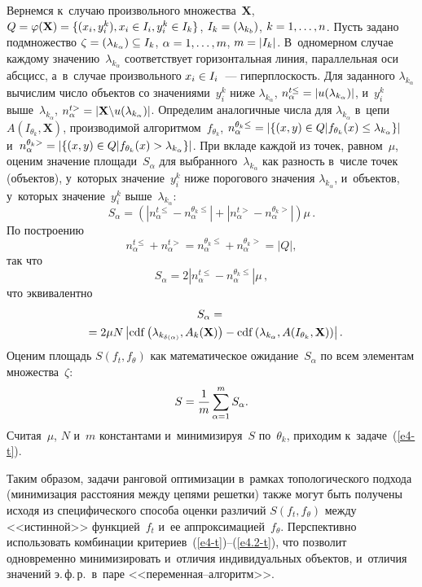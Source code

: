 \begin{multicols}{2}
    Вернемся к~случаю произвольного множества~$\mathbf{X}$, $Q\hm= 
\varphi(\mathbf{X}) \hm=\{(x_i, y_i^k), x_i\hm\in I_i, y_i^k\hm\in I_k\}$, $I_k\hm= 
(\lambda_{k_b})$, $k\hm=1,\ldots,n$. Пусть задано подмножество 
$\zeta\hm=(\lambda_{k_\alpha})\hm\subseteq I_k$, $\alpha\hm=1,\ldots ,m$, 
$m\hm=\vert I_k \vert$. В~одномерном случае каждому 
значению~$\lambda_{k_\alpha}$ соответствует горизонтальная линия, 
параллельная оси абсцисс, а~в~случае произвольного $x_i\hm\in I_i$~--- 
гиперплоскость. Для заданного $\lambda_{k_\alpha}$ вычислим число объектов 
со значениями~$y_i^k$ ниже $\lambda_{k_\alpha}$, $n_\alpha^{t\leq} \hm= \vert 
u(\lambda_{k_\alpha})\vert$, и~$y_i^k$ выше~$\lambda_{k_\alpha}$, 
$n_\alpha^{t>} \hm= \vert \mathbf{X}\backslash u(\lambda_{k_\alpha})\vert$. 
Определим аналогичные числа для $\lambda_{k_\alpha}$ 
в~цепи~${A}(I_{\theta_k}, \mathbf{X})$, производимой 
алгоритмом~$f_{\theta_k}$, $n_\alpha^{\theta_k \leq} \hm= \vert \{ (x,y)\hm\in 
Q\vert f_{\theta_k}(x)\leq \lambda_{k_\alpha}\}\vert$ и~$n_\alpha^{\theta_k >} 
\hm= \vert \{ (x,y)\hm\in Q\vert f_{\theta_k}(x)\hm> \lambda_{k_\alpha}\}\vert$. 
При вкладе каждой из точек, равном~$\mu$, оценим значение 
площади~$S_\alpha$ для выбранного~$\lambda_{k_\alpha}$ как разность 
в~чис\-ле точек (объектов), у~которых значение~$y_i^k$ ниже порогового 
значения $\lambda_{k_\alpha}$, и~объектов, у~которых значение~$y_i^k$ 
выше~$\lambda_{k_\alpha}$:
$$
S_\alpha= \left(\left\vert n_\alpha^{t\leq} - 
n_\alpha^{\theta_k \leq} \right\vert + \left\vert n_\alpha^{t>} - n_\alpha^{\theta_k 
>}\right\vert \right) \mu\,.
$$
 По построению 
 $$
 n_\alpha^{t\leq} + n_\alpha^{t>} = 
n_\alpha^{\theta_k \leq} + n_\alpha^{\theta_k >} = \vert Q\vert,
$$
 так что 
$$
S_\alpha= 2\left\vert n_\alpha^{t\leq} - n_\alpha^{\theta_k \leq}\right\vert \mu\,,
$$
 что 
эквивалентно 
\begin{multline*}
S_\alpha ={}\\
{}= 2\mu N\left\vert \mathrm{cdf} \left( 
\lambda_{k_{\delta(\alpha)}},{A}_k(\mathbf{X})\right)- \mathrm{cdf} 
\left( \lambda_{k_\alpha}, {A}(I_{\theta_k},\mathbf{X})\right)\right\vert.\hspace*{-4.67494pt}
\end{multline*}
Оценим площадь $S(f_t,f_\theta)$ как математическое ожидание~$S_\alpha$ по 
всем элементам множества~$\zeta$:
$$
S= \displaystyle\frac{\displaystyle 1\mathstrut}{\displaystyle m\mathstrut}\sum\limits^m_{\alpha=1} S_\alpha.
$$
 Считая~$\mu$, $N$ и~$m$ константами и~минимизируя~$S$ 
по~$\theta_k$, приходим к~задаче~(\ref{e4-t}). 
    
Таким образом, задачи ранговой оптимизации в~рамках 
топологического подхода (минимизация расстояния между цепями решетки) 
также могут быть получены исходя из специфического способа оценки 
различий $S(f_t, f_\theta)$ между <<истинной>> функцией~$f_t$ и~ее 
аппроксимацией~$f_\theta$. Перспективно использовать комбинации 
критериев~(\ref{e4-t})--(\ref{e4.2-t}), что позволит одновременно 
минимизировать и~отличия индивидуальных объектов, и~отличия значений 
э.\,ф.\,р.\ в~паре <<пе\-ре\-мен\-ная--ал\-го\-ритм>>.


\end{multicols}
